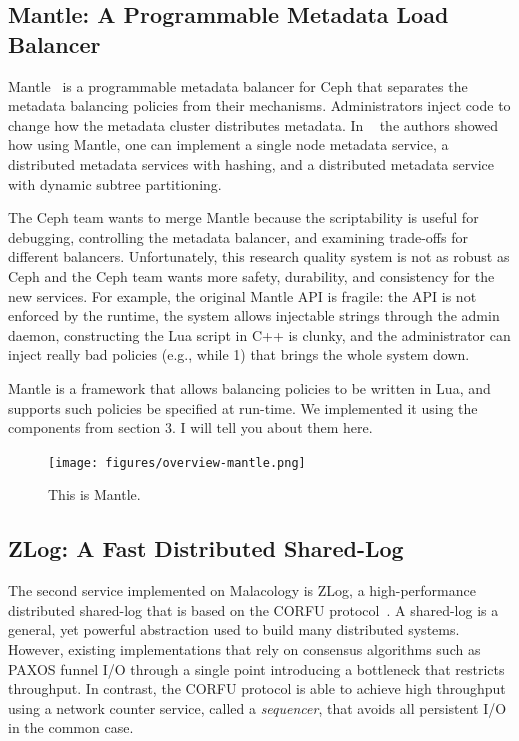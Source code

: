 \documentclass[10pt,twocolumn]{article}
\begin{document}
\subsection{Mantle: A Programmable Metadata Load Balancer}
\label{sec:mantle}

Mantle~\cite{sevilla:sc15-mantle} is a programmable metadata
balancer for Ceph that separates the metadata balancing policies from their
mechanisms. Administrators inject code to change how the metadata cluster
distributes metadata. In ~\cite{sevilla:sc15-mantle} the authors showed how 
using Mantle, one can implement a single node metadata service, a distributed 
metadata services with hashing, and a distributed metadata service with dynamic 
subtree partitioning.

The Ceph team wants to merge Mantle because the scriptability is useful
for debugging, controlling the metadata balancer, and examining
trade-offs for different balancers. Unfortunately, this research quality
system is not as robust as Ceph and the Ceph team wants more safety,
durability, and consistency for the new services. For example, the
original Mantle API is fragile: the API is not enforced by the runtime,
the system allows injectable strings through the admin daemon,
constructing the Lua script in C++ is clunky, and the administrator can
inject really bad policies (e.g., while 1) that brings the whole system
down.

Mantle is a framework that allows balancing policies to be written in Lua,
and supports such policies be specified at run-time.
We implemented it using the components from section 3. I will tell you about them here.


\begin{figure}[htbp]
\centering
\texttt{[image: figures/overview-mantle.png]}
\caption{This is Mantle.}
\end{figure}

\subsection{ZLog: A Fast Distributed Shared-Log}
\label{sec:zlog}

The second service implemented on Malacology is ZLog, a high-performance
distributed shared-log that is based on the CORFU
protocol~\cite{balakrishnan_corfu_2012}. A
shared-log is a general, yet powerful abstraction used to build many
distributed systems. However, existing implementations that rely on consensus
algorithms such as PAXOS funnel I/O through a single point introducing a
bottleneck that restricts throughput. In contrast, the CORFU protocol is able
to achieve high throughput using a network counter service, called a 
\emph{sequencer}, that avoids all persistent I/O in the common case.
\end{document}
